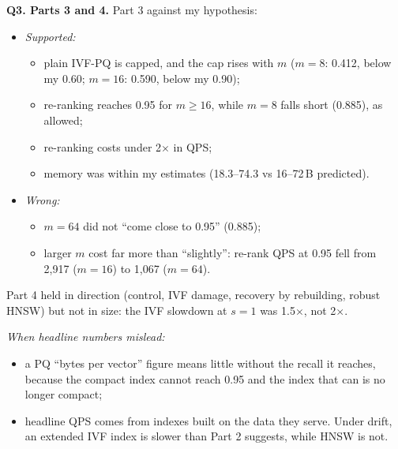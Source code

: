 \documentclass[10pt,twocolumn]{article}
\begin{document}
\textbf{Q3. Parts 3 and 4.} Part 3 against my hypothesis:
\begin{itemize}
\item \emph{Supported:}
  \begin{itemize}
  \item plain IVF-PQ is capped, and the cap rises with $m$ ($m{=}8$: 0.412, below my 0.60;
    $m{=}16$: 0.590, below my 0.90);
  \item re-ranking reaches 0.95 for $m\ge16$, while $m{=}8$ falls short (0.885), as allowed;
  \item re-ranking costs under 2$\times$ in QPS;
  \item memory was within my estimates (18.3--74.3 vs 16--72\,B predicted).
  \end{itemize}
\item \emph{Wrong:}
  \begin{itemize}
  \item $m{=}64$ did not ``come close to 0.95'' (0.885);
  \item larger $m$ cost far more than ``slightly'': re-rank QPS at 0.95 fell from 2,917
    ($m{=}16$) to 1,067 ($m{=}64$).
  \end{itemize}
\end{itemize}
Part 4 held in direction (control, IVF damage, recovery by rebuilding, robust HNSW) but not in
size: the IVF slowdown at $s=1$ was 1.5$\times$, not 2$\times$.

\emph{When headline numbers mislead:}
\begin{itemize}
\item a PQ ``bytes per vector'' figure means little without the recall it reaches, because the
  compact index cannot reach 0.95 and the index that can is no longer compact;
\item headline QPS comes from indexes built on the data they serve. Under drift, an extended IVF
  index is slower than Part 2 suggests, while HNSW is not.
\end{itemize}
\end{document}
